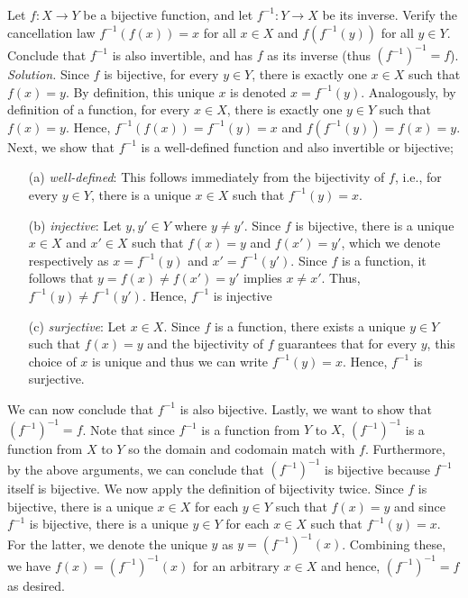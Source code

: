 \documentclass{amsart}
\theoremstyle{definition}
\newcommand{\soln}{\newline\textit{Solution.} }
\begin{document}
\subsubsection{} Let $f:X\to Y$ be a bijective function, and let $f^{-1}:Y\to X$ be its inverse. Verify the cancellation law $f^{-1}(f(x))=x$ for all $x\in X$ and $f(f^{-1}(y))$ for all $y\in Y$. Conclude that $f^{-1}$ is also invertible, and has $f$ as its inverse (thus $(f^{-1})^{-1}=f$). \\
\soln Since $f$ is bijective, for every $y\in Y$, there is exactly one $x\in X$ such that $f(x)=y$. By definition, this unique $x$ is denoted $x=f^{-1}(y)$. Analogously, by definition of a function, for every $x\in X$, there is exactly one $y\in Y$ such that $f(x)=y$. Hence, $f^{-1}(f(x))=f^{-1}(y)=x$ and $f(f^{-1}(y))=f(x)=y$. Next, we show that $f^{-1}$ is a well-defined function and also invertible or bijective;
\begin{enumerate}
\item[(a)] \textit{well-defined}: This follows immediately from the bijectivity of $f$, i.e., for every $y\in Y$, there is a unique $x\in X$ such that $f^{-1}(y)=x$. 
\item[(b)] \textit{injective}: Let $y,y'\in Y$ where $y\neq y'$. Since $f$ is bijective, there is a unique $x\in X$ and $x'\in X$ such that $f(x)=y$ and $f(x')=y'$, which we denote respectively as $x=f^{-1}(y)$ and $x'=f^{-1}(y')$. Since $f$ is a function, it follows that $y=f(x)\neq f(x')=y'$ implies $x\neq x'$. Thus, $f^{-1}(y)\neq f^{-1}(y')$. Hence, $f^{-1}$ is injective
\item[(c)] \textit{surjective}: Let $x\in X$. Since $f$ is a function, there exists a unique $y\in Y$ such that $f(x)=y$ and the bijectivity of $f$ guarantees that for every $y$, this choice of $x$ is unique and thus we can write $f^{-1}(y)=x$. Hence, $f^{-1}$ is surjective. 
\end{enumerate}
We can now conclude that $f^{-1}$ is also bijective. Lastly, we want to show that $(f^{-1})^{-1}=f$. Note that since $f^{-1}$ is a function from $Y$ to $X$, $(f^{-1})^{-1}$ is a function from $X$ to $Y$ so the domain and codomain match with $f$. Furthermore, by the above arguments, we can conclude that $(f^{-1})^{-1}$ is bijective because $f^{-1}$ itself is bijective. We now apply the definition of bijectivity twice. Since $f$ is bijective, there is a unique $x\in X$ for each $y\in Y$ such that $f(x)=y$ and since $f^{-1}$ is bijective, there is a unique $y\in Y$ for each $x\in X$ such that $f^{-1}(y)=x$. For the latter, we denote the unique $y$ as $y=(f^{-1})^{-1}(x)$. Combining these, we have $f(x)=(f^{-1})^{-1}(x)$ for an arbitrary $x\in X$ and hence, $(f^{-1})^{-1}=f$ as desired. \\
\end{document}
